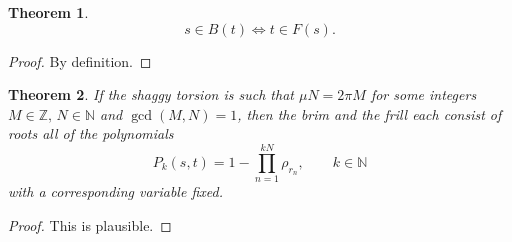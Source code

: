 \documentclass{article}
\theoremstyle{plain}
\newtheorem{theorem}{Theorem}[section]
\theoremstyle{definition}
\begin{document}
    \begin{theorem}
        $$ 
            s \in B(t) \Leftrightarrow t \in F(s)
        .$$
    \end{theorem}
    \begin{proof}
        By definition.
    \end{proof}


    \begin{theorem}
        If the shaggy torsion is such that
        $\mu N = 2\pi M$ for some integers $M \in \mathbb Z,\, N \in \mathbb N$ and  $\gcd(M,N)=1$, then the brim and the frill each consist of roots all of the polynomials$$
            P_k(s,t) = 1 - \prod_{n=1}^{kN} \rho_{r_n}, \qquad k \in \mathbb N      
        $$ with a corresponding variable fixed. 
    \end{theorem}
    \begin{proof}
        This is plausible.%
    \end{proof}
\end{document}
